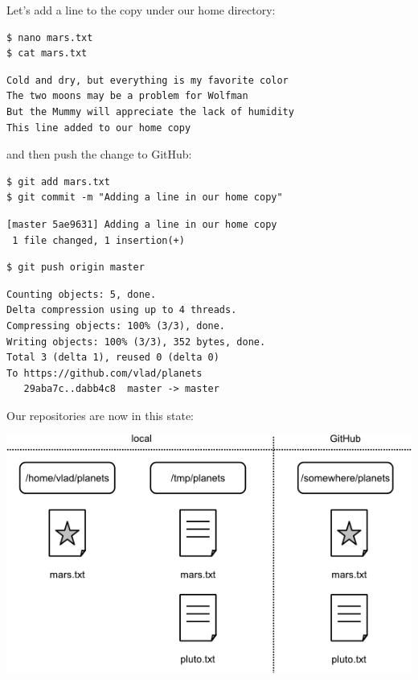 \documentclass[]{book}
\begin{document}
Let's add a line to the copy under our home directory:

\begin{verbatim}
$ nano mars.txt
$ cat mars.txt
\end{verbatim}

\begin{verbatim}
Cold and dry, but everything is my favorite color
The two moons may be a problem for Wolfman
But the Mummy will appreciate the lack of humidity
This line added to our home copy
\end{verbatim}

and then push the change to GitHub:

\begin{verbatim}
$ git add mars.txt
$ git commit -m "Adding a line in our home copy"
\end{verbatim}

\begin{verbatim}
[master 5ae9631] Adding a line in our home copy
 1 file changed, 1 insertion(+)
\end{verbatim}

\begin{verbatim}
$ git push origin master
\end{verbatim}

\begin{verbatim}
Counting objects: 5, done.
Delta compression using up to 4 threads.
Compressing objects: 100% (3/3), done.
Writing objects: 100% (3/3), 352 bytes, done.
Total 3 (delta 1), reused 0 (delta 0)
To https://github.com/vlad/planets
   29aba7c..dabb4c8  master -> master
\end{verbatim}

Our repositories are now in this state:

\includegraphics{novice/git/img/git-after-first-conflicting-change.png}
\end{document}
